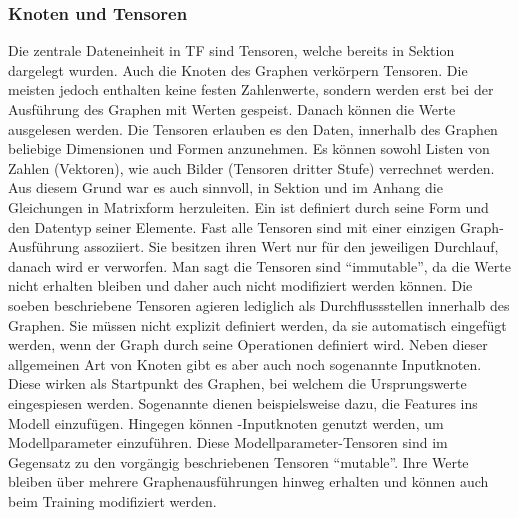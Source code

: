 \subsubsection{Knoten und Tensoren}
Die zentrale Dateneinheit in TF sind Tensoren, welche bereits in Sektion
 dargelegt wurden. Auch die Knoten des Graphen
verkörpern Tensoren. Die meisten jedoch enthalten keine festen Zahlenwerte,
sondern werden erst bei der Ausführung des Graphen mit Werten gespeist. Danach können
die Werte ausgelesen werden.
\para{}
Die Tensoren erlauben es den Daten, innerhalb des Graphen beliebige
Dimensionen und Formen anzunehmen. Es können
sowohl Listen von Zahlen (Vektoren), wie auch Bilder (Tensoren dritter Stufe)
verrechnet werden. Aus diesem Grund war es auch sinnvoll, in Sektion
 und im Anhang  die Gleichungen in
Matrixform herzuleiten.
\para{}
Ein  ist definiert durch seine Form und den Datentyp seiner
Elemente. Fast alle Tensoren sind mit einer einzigen Graph-Ausführung
assoziiert. Sie besitzen ihren Wert nur für den jeweiligen Durchlauf, danach wird
er verworfen. Man sagt die Tensoren sind ``immutable'', da die Werte nicht
erhalten bleiben und daher auch nicht modifiziert werden können.
\para{}
Die soeben beschriebene Tensoren agieren lediglich als Durchflussstellen innerhalb des
Graphen. Sie müssen nicht explizit definiert werden, da sie automatisch
eingefügt werden, wenn der Graph durch seine Operationen definiert wird.
\para{}
Neben dieser allgemeinen Art von Knoten gibt es aber auch noch sogenannte
Inputknoten. Diese wirken als Startpunkt des Graphen, bei welchem die
Ursprungswerte eingespiesen werden.
Sogenannte  dienen beispielsweise dazu, die Features ins Modell einzufügen.
Hingegen können -Inputknoten genutzt werden, um Modellparameter einzuführen.
Diese Modellparameter-Tensoren sind im Gegensatz zu den vorgängig beschriebenen Tensoren
``mutable''. Ihre Werte bleiben über mehrere Graphenausführungen hinweg erhalten und
können auch beim Training modifiziert werden.


